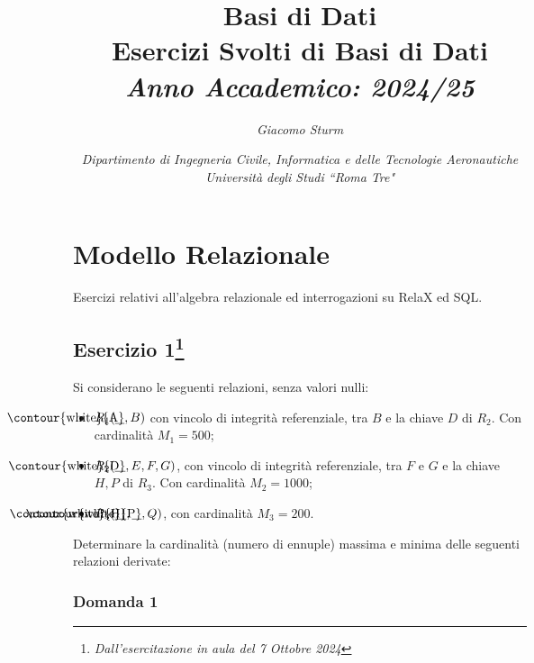 \documentclass{article}
\newcommand{\myuline}[1]{%
    \uline{\phantom{#1}}%
    \llap{\contour{white}{#1}}%
}
\begin{document}
\title{%
    \textbf{Basi di Dati}  \\ 
    \large Esercizi Svolti di Basi di Dati \\
    \textit{Anno Accademico: 2024/25}}
\author{\textit{Giacomo Sturm}}
\date{\textit{Dipartimento di Ingegneria Civile, Informatica e delle Tecnologie Aeronautiche \\
Università degli Studi ``Roma Tre"}}

\maketitle
\thispagestyle{link}

\clearpage


\pagestyle{fancy}
\fancyhead{}\fancyfoot{}
\fancyfoot[C]{\thepage}

\tableofcontents

\clearpage
{}

\section{Modello Relazionale}

Esercizi relativi all'algebra relazionale ed interrogazioni su RelaX ed SQL. 

\subsection{Esercizio 1\footnote{\textit{Dall'esercitazione in aula del 7 Ottobre 2024}}}


Si considerano le seguenti relazioni, senza valori nulli:
\begin{itemize}
    \item $R_1(\myuline{A},B)$ con vincolo di integrità referenziale, tra $B$ e la chiave $D$ di $R_2$. Con cardinalità $M_1=500$;
    \item $R_2(\myuline{D},E,F,G)$, con vincolo di integrità referenziale, tra $F$ e $G$ e la chiave $H,P$ di $R_3$. Con cardinalità $M_2=1000$;
    \item $R_3(\myuline{H},\myuline{P},Q)$, con cardinalità $M_3=200$.
\end{itemize}

Determinare la cardinalità (numero di ennuple) massima e minima delle seguenti relazioni derivate:

\subsubsection*{Domanda 1}
\end{document}
